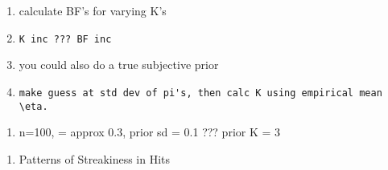 \documentclass[12pt,twoside]{dukestatscithesis}
\providecommand{\tightlist}{%
  \setlength{\itemsep}{0pt}\setlength{\parskip}{0pt}}
\theoremstyle{definition}
\theoremstyle{definition}
\theoremstyle{definition}
\theoremstyle{remark}
\begin{document}
\begin{enumerate}
\begin{verbatim}
\end{verbatim}
  \begin{enumerate}
  \def\labelenumii{\alph{enumii}.}
  \item
    calculate BF's for varying K's
  \item
\begin{verbatim}
K inc ??? BF inc
\end{verbatim}
  \item
    you could also do a true subjective prior
  \item
\begin{verbatim}
make guess at std dev of pi's, then calc K using empirical mean \eta.
\end{verbatim}
  \end{enumerate}
  \begin{enumerate}
  \def\labelenumii{\roman{enumii}.}
  \setcounter{enumii}{1}
  \tightlist
  \item
    n=100, \eta = approx 0.3, prior sd = 0.1 ??? prior K = 3
  \end{enumerate}
\end{enumerate}
\begin{enumerate}
\def\labelenumi{\Alph{enumi}.}
\setcounter{enumi}{3}
\tightlist
\item
  Patterns of Streakiness in Hits
\end{enumerate}
\end{document}
